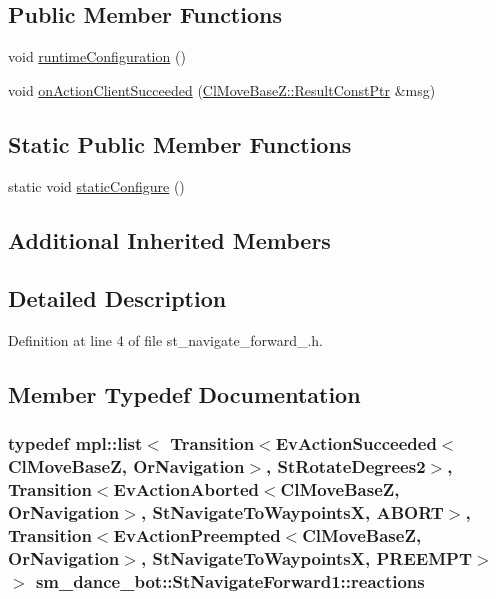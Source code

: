 \subsection*{Public Member Functions}
\begin{DoxyCompactItemize}
\item 
void \hyperlink{structsm__dance__bot_1_1StNavigateForward1_a171dea7ed3ef92dddc0ec36eb6a9e319}{runtime\+Configuration} ()
\item 
void \hyperlink{structsm__dance__bot_1_1StNavigateForward1_ab5af8fd66b5c39ffef4829233d449d55}{on\+Action\+Client\+Succeeded} (\hyperlink{classmove__base__z__client_1_1ClMoveBaseZ_a3b774d99d3dd4526f99b968d65ef5834}{Cl\+Move\+Base\+Z\+::\+Result\+Const\+Ptr} \&msg)
\end{DoxyCompactItemize}
\subsection*{Static Public Member Functions}
\begin{DoxyCompactItemize}
\item 
static void \hyperlink{structsm__dance__bot_1_1StNavigateForward1_a5c18e9458f6b9bd0e06f7f242e5bc2da}{static\+Configure} ()
\end{DoxyCompactItemize}
\subsection*{Additional Inherited Members}


\subsection{Detailed Description}


Definition at line 4 of file st\+\_\+navigate\+\_\+forward\+\_.\+h.



\subsection{Member Typedef Documentation}
\subsubsection[{\texorpdfstring{reactions}{reactions}}]{\setlength{\rightskip}{0pt plus 5cm}typedef mpl\+::list$<$ Transition$<$Ev\+Action\+Succeeded$<${\bf Cl\+Move\+BaseZ}, {\bf Or\+Navigation}$>$, {\bf St\+Rotate\+Degrees2}$>$, Transition$<$Ev\+Action\+Aborted$<${\bf Cl\+Move\+BaseZ}, {\bf Or\+Navigation}$>$, {\bf St\+Navigate\+To\+WaypointsX}, {\bf A\+B\+O\+RT}$>$, Transition$<$Ev\+Action\+Preempted$<${\bf Cl\+Move\+BaseZ}, {\bf Or\+Navigation}$>$, {\bf St\+Navigate\+To\+WaypointsX}, {\bf P\+R\+E\+E\+M\+PT}$>$ $>$ {\bf sm\+\_\+dance\+\_\+bot\+::\+St\+Navigate\+Forward1\+::reactions}}\hypertarget{structsm__dance__bot_1_1StNavigateForward1_a4a49d0c774d44f96b17ceac4c6628104}{}\label{structsm__dance__bot_1_1StNavigateForward1_a4a49d0c774d44f96b17ceac4c6628104}


